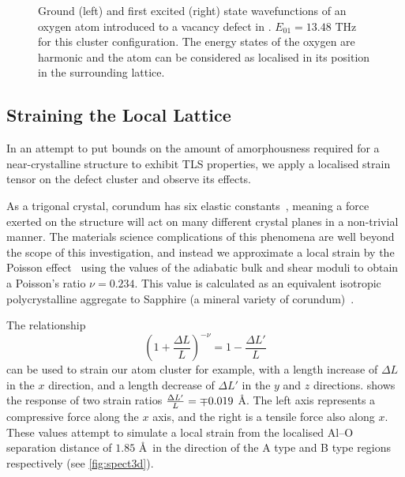 \begin{figure}[htp]
\resizebox{0.5\textwidth}{!}{}
\caption[Oxygen Recovering Crystalline Position]{\label{fig:clustrecover}Ground (left) and first excited (right) state wavefunctions of an oxygen atom introduced to a vacancy defect in . $E_{01} = 13.48$ THz for this cluster configuration. The energy states of the oxygen are harmonic and the atom can be considered as localised in its position in the surrounding lattice.}
\end{figure}

\subsection{Straining the Local Lattice}

In an attempt to put bounds on the amount of amorphousness required for a near-crystalline structure to exhibit TLS properties, we apply a localised strain tensor on the defect cluster and observe its effects.

As a trigonal crystal, corundum has six elastic constants~\cite{Bass1995}, meaning a force exerted on the structure will act on many different crystal planes in a non-trivial manner.
The materials science complications of this phenomena are well beyond the scope of this investigation, and instead we approximate a local strain by the Poisson effect~\cite{Poisson1829} using the values of the adiabatic bulk and shear moduli to obtain a Poisson's ratio $\nu = 0.234$.
This value is calculated as an equivalent isotropic polycrystalline aggregate to Sapphire (a mineral variety of corundum)~\cite{Gercek2007}.

The relationship
\begin{equation}
\left(1+\frac{\Delta L}{L}\right)^{-\nu} = 1-\frac{\Delta L'}{L}
\label{eq:strain}
\end{equation}
can be used to strain our atom cluster for example, with a length increase of $\Delta L$ in the $x$ direction, and a length decrease of $\Delta L'$ in the $y$ and $z$ directions.
 shows the response of two strain ratios $\cramped{\frac{\Delta L'}{L}} = \mp 0.019$ \AA.
The left axis represents a compressive force along the $x$ axis, and the right is a tensile force also along $x$.
These values attempt to simulate a local strain from the localised Al--O separation distance of $1.85$ \AA\ in the direction of the A type and B type regions respectively (see \cref{fig:spect3d}).

